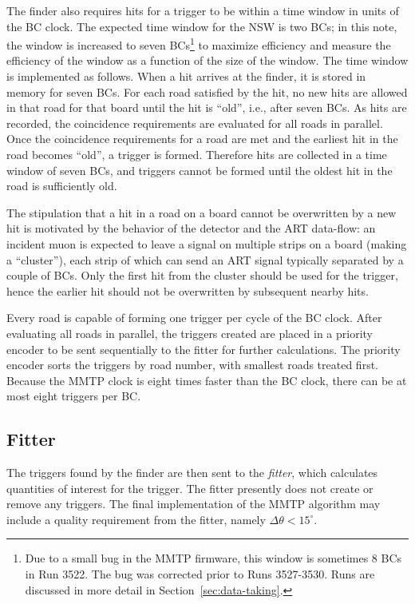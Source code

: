 The finder also requires hits for a trigger to be within a time window in units of the BC clock. The expected time window for the NSW is two BCs; in this note, the window is increased to seven BCs\footnote{Due to a small bug in the MMTP firmware, this window is sometimes 8 BCs in Run 3522. The bug was corrected prior to Runs 3527-3530. Runs are discussed in more detail in Section~\ref{sec:data-taking}.} to maximize efficiency and measure the efficiency of the window as a function of the size of the window. The time window is implemented as follows. When a hit arrives at the finder, it is stored in memory for seven BCs. For each road satisfied by the hit, no new hits are allowed in that road for that board until the hit is ``old'', i.e., after seven BCs. As hits are recorded, the coincidence requirements are evaluated for all roads in parallel. Once the coincidence requirements for a road are met and the earliest hit in the road becomes ``old'', a trigger is formed. Therefore hits are collected in a time window of seven BCs, and triggers cannot be formed until the oldest hit in the road is sufficiently old.

The stipulation that a hit in a road on a board cannot be overwritten by a new hit is motivated by the behavior of the detector and the ART data-flow: an incident muon is expected to leave a signal on multiple strips on a board (making a ``cluster''), each strip of which can send an ART signal typically separated by a couple of BCs. Only the first hit from the cluster should be used for the trigger, hence the earlier hit should not be overwritten by subsequent nearby hits. 

Every road is capable of forming one trigger per cycle of the BC clock. After evaluating all roads in parallel, the triggers created are placed in a priority encoder to be sent sequentially to the fitter for further calculations. The priority encoder sorts the triggers by road number, with smallest roads treated first. Because the MMTP clock is eight times faster than the BC clock, there can be at most eight triggers per BC.

\subsection{Fitter}
\label{sec:alg-fitter}

The triggers found by the finder are then sent to the \textit{fitter}, which calculates quantities of interest for the trigger. The fitter presently does not create or remove any triggers. The final implementation of the MMTP algorithm may include a quality requirement from the fitter, namely $\Delta\theta < 15^\circ$.

